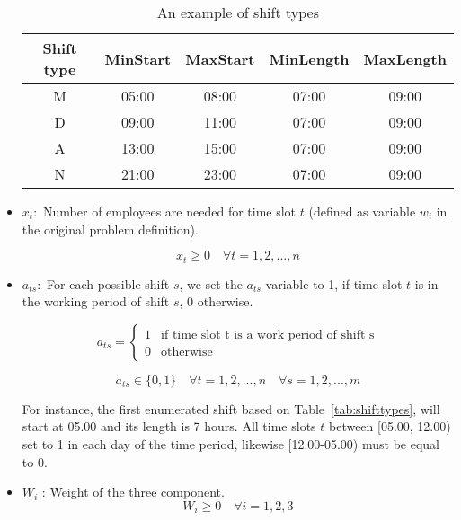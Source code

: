 \begin{itemize}
\begin{table}
  \centering
  \begin{tabular}{ccccc}
    \toprule
    Shift type & MinStart         & MaxStart      & MinLength & MaxLength        \\
    \midrule
    M     & 05:00	 & 08:00          & 07:00 	& 09:00        \\
    D     & 09:00	 & 11:00          & 07:00	& 09:00        \\
    A     & 13:00	 & 15:00          & 07:00	& 09:00        \\
    N     & 21:00	 & 23:00          & 07:00	& 09:00        \\
    \bottomrule
  \end{tabular}
  \caption{An example of shift types}
  \label{tab:shifttypes2} 
\end{table}

\item $x_t : $ Number of employees are needed for time slot $t$ (defined as variable $w_i$ in the original problem definition). 

\begin{equation}
x_t \ge 0 \quad \forall t = 1, 2, ..., n
\end{equation}

\item $a_{ts} :$ For each possible shift $s$, we set the $a_{ts}$ variable to 1, if time slot $t$ is in the working period of shift $s$, 0 otherwise.


\begin{equation}
a_{ts} = \left\{ \begin{array}{cc}
		1 & \mbox{if time slot t is a work period of shift s} \\
		0 & \mbox{otherwise}
	    \end{array}
    \right.
\end{equation}

\begin{equation}
a_{ts} \in \{0, 1\} \quad \forall t = 1, 2, ..., n  \quad \forall s = 1, 2, ..., m
\end{equation}

For instance, the first enumerated shift based on Table~\ref{tab:shifttypes}, will start at 05.00 and its length is 7 hours. All time slots $t$ between [05.00, 12.00) set to 1 in each day of the time period, likewise [12.00-05.00) must be equal to 0.


\item $W_i$ : Weight of the three component. 
\begin{equation}
W_i \ge 0 \quad \forall i = 1, 2, 3
\end{equation}
\end{itemize}

